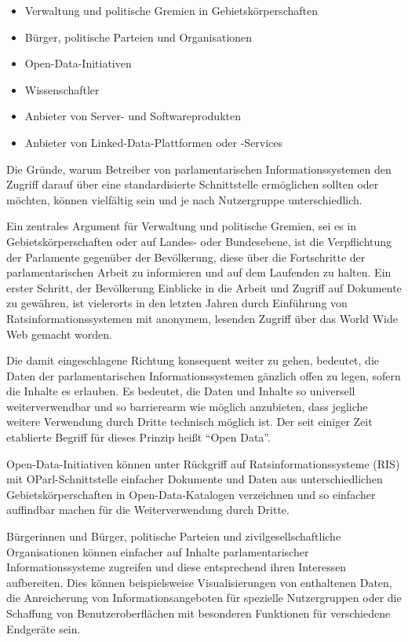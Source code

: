 \documentclass[,a4paper]{article}
\begin{document}
\begin{itemize}
\itemsep1pt\parskip0pt
\item
  Verwaltung und politische Gremien in Gebietskörperschaften
\item
  Bürger, politische Parteien und Organisationen
\item
  Open-Data-Initiativen
\item
  Wissenschaftler
\item
  Anbieter von Server- und Softwareprodukten
\item
  Anbieter von Linked-Data-Plattformen oder -Services
\end{itemize}

Die Gründe, warum Betreiber von parlamentarischen Informationssystemen
den Zugriff darauf über eine standardisierte Schnittstelle ermöglichen
sollten oder möchten, können vielfältig sein und je nach Nutzergruppe
unterschiedlich.

Ein zentrales Argument für Verwaltung und politische Gremien, sei es in
Gebietskörperschaften oder auf Landes- oder Bundesebene, ist die
Verpflichtung der Parlamente gegenüber der Bevölkerung, diese über die
Fortschritte der parlamentarischen Arbeit zu informieren und auf dem
Laufenden zu halten. Ein erster Schritt, der Bevölkerung Einblicke in
die Arbeit und Zugriff auf Dokumente zu gewähren, ist vielerorts in den
letzten Jahren durch Einführung von Ratsinformationssystemen mit
anonymem, lesenden Zugriff über das World Wide Web gemacht worden.

Die damit eingeschlagene Richtung konsequent weiter zu gehen, bedeutet,
die Daten der parlamentarischen Informationssystemen gänzlich offen zu
legen, sofern die Inhalte es erlauben. Es bedeutet, die Daten und
Inhalte so universell weiterverwendbar und so barrierearm wie möglich
anzubieten, dass jegliche weitere Verwendung durch Dritte technisch
möglich ist. Der seit einiger Zeit etablierte Begriff für dieses Prinzip
heißt ``Open Data''.

Open-Data-Initiativen können unter Rückgriff auf Ratsinformationssysteme
(RIS) mit OParl-Schnittstelle einfacher Dokumente und Daten aus
unterschiedlichen Gebietskörperschaften in Open-Data-Katalogen
verzeichnen und so einfacher auffindbar machen für die Weiterverwendung
durch Dritte.

Bürgerinnen und Bürger, politische Parteien und zivilgesellschaftliche
Organisationen können einfacher auf Inhalte parlamentarischer
Informationssysteme zugreifen und diese entsprechend ihren Interessen
aufbereiten. Dies können beispielsweise Visualisierungen von enthaltenen
Daten, die Anreicherung von Informationsangeboten für spezielle
Nutzergruppen oder die Schaffung von Benutzeroberflächen mit besonderen
Funktionen für verschiedene Endgeräte sein.
\end{document}
